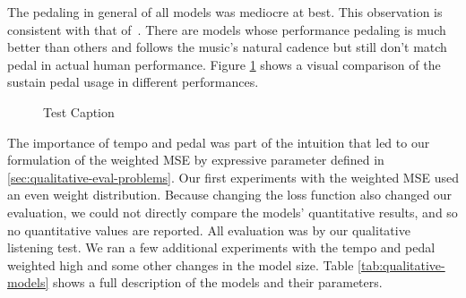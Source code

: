 The pedaling in general of all models was mediocre at best. This observation is consistent with that of~\citet{jeong2019virtuosonet}. There are models whose performance pedaling is much better than others and follows the music's natural cadence but still don't match pedal in actual human performance. Figure \ref{fig:pedal-difference} shows a visual comparison of the sustain pedal usage in different performances. 

\begin{figure}
    \centering
    \caption{Test Caption}
    \label{fig:pedal-difference}
\end{figure}

The importance of tempo and pedal was part of the intuition that led to our formulation of the weighted MSE by expressive parameter defined in \ref{sec:qualitative-eval-problems}. Our first experiments with the weighted MSE used an even weight distribution. Because changing the loss function also changed our evaluation, we could not directly compare the models' quantitative results, and so no quantitative values are reported. All evaluation was by our qualitative listening test. We ran a few additional experiments with the tempo and pedal weighted high and some other changes in the model size. Table \ref{tab:qualitative-models} shows a full description of the models and their parameters.

\newcommand{\am}{$AM$}


